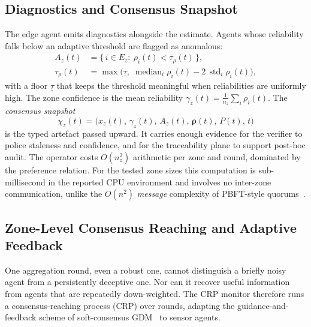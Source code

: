 \documentclass[smartcities,article,submit,moreauthors]{Definitions/mdpi}
\newcommand{\rel}{\rho}
\begin{document}
\subsection{Diagnostics and Consensus Snapshot}
\label{sec:snapshot}

The edge agent emits diagnostics alongside the estimate. Agents whose
reliability falls below an adaptive threshold are flagged as anomalous:
\begin{equation}
\begin{aligned}
A_z(t)&=\bigl\{\, i \in E_z :\ \rel_i(t) < \tau_{\rho}(t) \,\bigr\},\\
\tau_{\rho}(t)&=\max\!\bigl(\underline{\tau},\;
\operatorname{median}_i \rel_i(t) - 2\,\operatorname{std}_i
\rel_i(t)\bigr),
\end{aligned}
\label{eq:anomaly}
\end{equation}
with a floor $\underline{\tau}$ that keeps the threshold meaningful
when reliabilities are uniformly high. The zone confidence is the mean
reliability $\gamma_z(t)=\frac{1}{n_z}\sum_i \rel_i(t)$. The
\emph{consensus snapshot}
\begin{equation}
\chi_z(t)=\bigl(\hat{x}_z(t),\,\gamma_z(t),\,A_z(t),\,
\boldsymbol{\rel}(t),\,P(t),\,t\bigr)
\label{eq:snapshot}
\end{equation}
is the typed artefact passed upward. It carries enough evidence for the
verifier to police staleness and confidence, and for the traceability
plane to support post-hoc audit. The operator costs
$O(n_z^2)$ arithmetic per zone and round, dominated by the preference
relation. For the tested zone sizes this computation is sub-millisecond in the
reported CPU environment and involves no inter-zone
communication, unlike the $O(n^2)$ \emph{message} complexity of
PBFT-style quorums~\cite{castro1999}.

\subsection{Zone-Level Consensus Reaching and Adaptive Feedback}
\label{sec:crp}

One aggregation round, even a robust one, cannot distinguish a briefly
noisy agent from a persistently deceptive one. Nor can it recover useful
information from agents that are repeatedly down-weighted. The CRP
monitor therefore runs a consensus-reaching process (CRP) over rounds,
adapting the guidance-and-feedback scheme of soft-consensus
GDM~\cite{herreraviedma2002,herreraviedma2007,
cabrerizo2009,cabrerizo2010kbs} to sensor agents.
\end{document}
